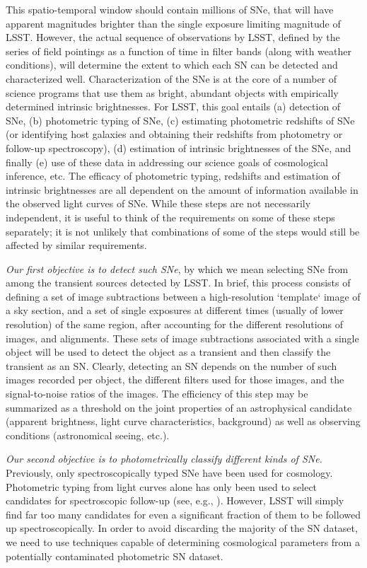 This spatio-temporal window should contain millions  of SNe, that will have apparent magnitudes brighter than the single exposure limiting magnitude of LSST.  However, the actual
 sequence of observations by LSST, defined by the series of field pointings as a
 function of time in filter bands (along with weather conditions), will
 determine the extent to which each SN can be detected and
 characterized well.  Characterization of the SNe is at the core of a
 number of science programs that use them as bright, abundant objects with empirically determined intrinsic brightnesses. For LSST, this goal entails (a) detection of SNe, (b) photometric typing of SNe, (c) estimating photometric redshifts of SNe (or identifying host galaxies 
 and obtaining their redshifts from photometry or follow-up spectroscopy),
(d) estimation of intrinsic brightnesses of the SNe, and finally (e) use of these data in addressing our science goals of cosmological inference, etc.
The efficacy of photometric typing, redshifts and estimation of intrinsic brightnesses are all
dependent on the amount of information available in the observed light curves of SNe. While these steps are not necessarily independent, it is useful to think of the requirements on some of these steps separately; it is not unlikely  that combinations of some of the steps would still be affected by similar requirements. 

{\emph{Our first objective is to detect such SNe}}, by which we mean
selecting SNe from among the transient sources detected by LSST.
In brief, this process 
consists of defining a set of image subtractions between a high-resolution
`template` image of a sky section, and a set of single exposures at
different times (usually of lower resolution) of the same region, after 
accounting for the different resolutions of images, and alignments. These sets of image subtractions associated
 with a single object will be used to detect the object as a transient and then
classify the transient as an SN. Clearly, detecting an SN depends on the number of such images recorded per object, the different filters used for those images, and the signal-to-noise ratios of the images. %
The efficiency of this step may be summarized as a threshold on the joint properties 
of an astrophysical candidate (apparent brightness, light curve characteristics, background) as well as observing conditions (astronomical seeing, etc.).  

{\emph{Our second objective is to photometrically classify different kinds of SNe.}} 
Previously, only spectroscopically typed SNe have been used for cosmology. Photometric 
typing from light curves alone has only been used to select candidates for spectroscopic 
follow-up (see, e.g., \citet{Sako2008}). However, LSST will simply find far too many 
candidates for even a significant fraction of them to be followed up spectroscopically. In order to avoid 
discarding the majority of the SN dataset, we need to use techniques capable of 
determining cosmological parameters from a potentially contaminated photometric SN dataset.


